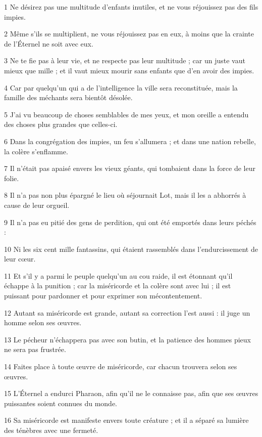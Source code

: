 
\par 1 Ne désirez pas une multitude d'enfants inutiles, et ne vous réjouissez pas des fils impies.
\par 2 Même s'ils se multiplient, ne vous réjouissez pas en eux, à moins que la crainte de l'Éternel ne soit avec eux.
\par 3 Ne te fie pas à leur vie, et ne respecte pas leur multitude ; car un juste vaut mieux que mille ; et il vaut mieux mourir sans enfants que d'en avoir des impies.
\par 4 Car par quelqu'un qui a de l'intelligence la ville sera reconstituée, mais la famille des méchants sera bientôt désolée.
\par 5 J'ai vu beaucoup de choses semblables de mes yeux, et mon oreille a entendu des choses plus grandes que celles-ci.
\par 6 Dans la congrégation des impies, un feu s'allumera ; et dans une nation rebelle, la colère s'enflamme.
\par 7 Il n'était pas apaisé envers les vieux géants, qui tombaient dans la force de leur folie.
\par 8 Il n'a pas non plus épargné le lieu où séjournait Lot, mais il les a abhorrés à cause de leur orgueil.
\par 9 Il n'a pas eu pitié des gens de perdition, qui ont été emportés dans leurs péchés :
\par 10 Ni les six cent mille fantassins, qui étaient rassemblés dans l'endurcissement de leur cœur.
\par 11 Et s'il y a parmi le peuple quelqu'un au cou raide, il est étonnant qu'il échappe à la punition ; car la miséricorde et la colère sont avec lui ; il est puissant pour pardonner et pour exprimer son mécontentement.
\par 12 Autant sa miséricorde est grande, autant sa correction l'est aussi : il juge un homme selon ses œuvres.
\par 13 Le pécheur n'échappera pas avec son butin, et la patience des hommes pieux ne sera pas frustrée.
\par 14 Faites place à toute œuvre de miséricorde, car chacun trouvera selon ses œuvres.
\par 15 L'Éternel a endurci Pharaon, afin qu'il ne le connaisse pas, afin que ses œuvres puissantes soient connues du monde.
\par 16 Sa miséricorde est manifeste envers toute créature ; et il a séparé sa lumière des ténèbres avec une fermeté.
